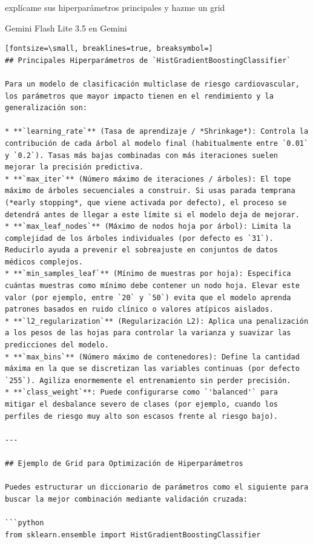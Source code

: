 \documentclass[12pt,a4paper,oneside]{book}
\begin{document}
\begin{iaprompt}
explícame sus hiperparámetros principales y hazme un grid
\end{iaprompt}
\begin{iaresp}{Gemini Flash Lite 3.5 en Gemini}
\begin{Verbatim}[fontsize=\small, breaklines=true, breaksymbol=]
## Principales Hiperparámetros de `HistGradientBoostingClassifier`

Para un modelo de clasificación multiclase de riesgo cardiovascular, los parámetros que mayor impacto tienen en el rendimiento y la generalización son:

* **`learning_rate`** (Tasa de aprendizaje / *Shrinkage*): Controla la contribución de cada árbol al modelo final (habitualmente entre `0.01` y `0.2`). Tasas más bajas combinadas con más iteraciones suelen mejorar la precisión predictiva.
* **`max_iter`** (Número máximo de iteraciones / árboles): El tope máximo de árboles secuenciales a construir. Si usas parada temprana (*early stopping*, que viene activada por defecto), el proceso se detendrá antes de llegar a este límite si el modelo deja de mejorar.
* **`max_leaf_nodes`** (Máximo de nodos hoja por árbol): Limita la complejidad de los árboles individuales (por defecto es `31`). Reducirlo ayuda a prevenir el sobreajuste en conjuntos de datos médicos complejos.
* **`min_samples_leaf`** (Mínimo de muestras por hoja): Especifica cuántas muestras como mínimo debe contener un nodo hoja. Elevar este valor (por ejemplo, entre `20` y `50`) evita que el modelo aprenda patrones basados en ruido clínico o valores atípicos aislados.
* **`l2_regularization`** (Regularización L2): Aplica una penalización a los pesos de las hojas para controlar la varianza y suavizar las predicciones del modelo.
* **`max_bins`** (Número máximo de contenedores): Define la cantidad máxima en la que se discretizan las variables continuas (por defecto `255`). Agiliza enormemente el entrenamiento sin perder precisión.
* **`class_weight`**: Puede configurarse como `'balanced'` para mitigar el desbalance severo de clases (por ejemplo, cuando los perfiles de riesgo muy alto son escasos frente al riesgo bajo).

---

## Ejemplo de Grid para Optimización de Hiperparámetros

Puedes estructurar un diccionario de parámetros como el siguiente para buscar la mejor combinación mediante validación cruzada:

```python
from sklearn.ensemble import HistGradientBoostingClassifier


\end{Verbatim}
\end{iaresp}
\end{document}
